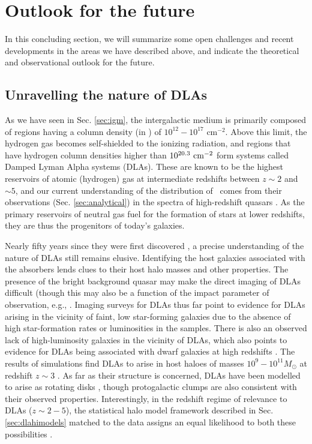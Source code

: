 \section{Outlook for the future}
\label{sec:outlook}
In this concluding section, we will summarize some open challenges and recent developments in the areas we have described above, and indicate the theoretical and observational outlook for the future.

\subsection{Unravelling the nature of DLAs}


As we have seen in Sec. \ref{sec:igm}, the intergalactic medium is primarily composed of regions having a column density (in \HI) of $10^{12} - 10^{17}$ cm$^{-2}$.  Above this limit, the hydrogen gas becomes self-shielded to the ionizing radiation, and  
regions that have hydrogen column densities higher than $10^{20.3} \ {\rm cm}^{-2}$ form systems called Damped Lyman Alpha systems (DLAs). These are known to be the highest reservoirs of atomic (hydrogen) gas at intermediate redshifts \cite{wolfe1986, lanzetta1991, storrielombardi2000, gardner1997, prochaska2005} between $z \sim 2$ and $\sim 5$, and our current understanding of the distribution of \HI\ comes from their  observations (Sec. \ref{sec:analytical}) in the spectra of high-redshift quasars \cite{noterdaeme09, noterdaeme12, prochaska09, prochaska2005, zafar2013}.
As the primary reservoirs of neutral gas fuel for the formation of stars at lower redshifts, they are thus the progenitors of today's  galaxies.

Nearly fifty years since they were first discovered \cite{lowrance1972, beaver1972},  a precise understanding of the nature of DLAs still remains elusive. Identifying the host galaxies associated with the absorbers lends clues to their host halo masses and other properties. The presence of the bright background quasar may make the direct imaging of DLAs difficult (though this may also be a function of the impact parameter of observation, e.g., \cite{mackenzie2019}. Imaging surveys for DLAs \cite{fynbo2010, fynbo2011, fynbo2013, bouche2013, rafelski2014, fumagalli2014} thus far point to evidence for DLAs arising in the vicinity of faint, low star-forming galaxies due to the absence of high star-formation rates or luminosities in the samples. There is also an observed lack of high-luminosity galaxies in the vicinity of DLAs, which also points to evidence for DLAs being associated with dwarf galaxies at high redshifts \cite{cooke2015}. The results of simulations find DLAs to arise in host haloes of masses $10^9 - 10^{11} M_{\odot}$ at redshift $z \sim 3$ \cite{pontzen2008, tescari2009, fumagalli2011, cen2012, voort2012, bird2013, rahmati2014}. As far as their structure is concerned, DLAs have been modelled to arise as rotating disks \cite{prochaska2010}, though protogalactic clumps \cite{haehnelt1998} are also consistent with their observed properties. Interestingly, in the redshift regime of relevance to DLAs ($z \sim 2-5$), the statistical halo model framework described in Sec. \ref{sec:dlahimodels} matched to the data assigns an equal likelihood to both these possibilities \cite{hparaa2017}.
 
